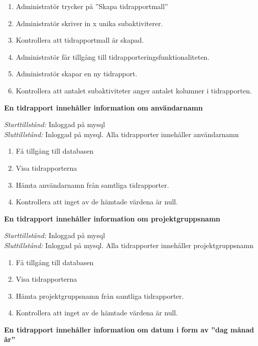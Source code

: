 \documentclass[a4paper]{article}
\begin{document}
\begin{FT}
\begin{enumerate}
\item Administratör trycker på ''Skapa tidrapportmall''
\item Administratör skriver in x unika subaktiviterer.
\item Kontrollera att tidrapportmall är skapad.
\item Administratör får tillgång till tidrapporteringsfunktionaliteten.
\item Administratör skapar en ny tidrapport.
\item Kontrollera att antalet subaktiviteter anger antalet kolumner i tidrapporten.
\end{enumerate}

\item
\textbf{En tidrapport innehåller information om användarnamn}

\emph{Starttillstånd:} Inloggad på mysql\\
\emph{Sluttillstånd:} Inloggad på mysql. Alla tidrapporter innehåller användarnamn\\

\begin{enumerate}
\item Få tillgång till databasen
\item Visa tidrapporterna
\item Hämta användarnamn från samtliga tidrapporter.
\item Kontrollera att inget av de hämtade värdena är null.
\end{enumerate}

\item
\textbf{En tidrapport innehåller information om projektgruppsnamn}

\emph{Starttillstånd:} Inloggad på mysql\\
\emph{Sluttillstånd:} Inloggad på mysql. Alla tidrapporter innehåller projektgruppsnamn\\

\begin{enumerate}
\item Få tillgång till databasen
\item Visa tidrapporterna
\item Hämta projektgruppsnamn från samtliga tidrapporter.
\item Kontrollera att inget av de hämtade värdena är null.
\end{enumerate}



\item
\textbf{En tidrapport innehåller information om datum i form av ''dag månad år''}


\end{FT}
\end{document}
